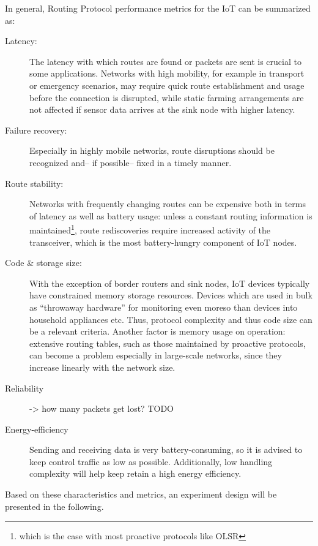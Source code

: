 \documentclass{acm_proc_article-sp}
\begin{document}
In general, Routing Protocol performance metrics for the IoT can be summarized as:
\begin{description}
\item[Latency:] The latency with which routes are found or packets are sent is crucial to some applications. Networks with high mobility, for example in transport or emergency scenarios, may require quick route establishment and usage before the connection is disrupted, while static farming arrangements are not affected if sensor data arrives at the sink node with higher latency.
\item[Failure recovery:] Especially in highly mobile networks, route disruptions should be recognized and-- if possible-- fixed in a timely manner.
\item[Route stability:] Networks with frequently changing routes can be expensive both in terms of latency as well as battery usage: unless a constant routing information is maintained\footnote{ which is the case with most proactive protocols like OLSR\cite{RFC-3626}}, route rediscoveries require increased activity of the transceiver, which is the most battery-hungry component of IoT nodes.
\item[Code \& storage size:] With the exception of border routers and sink nodes, IoT devices typically have constrained memory storage resources. Devices which are used in bulk as ``throwaway hardware'' for monitoring even moreso than devices into household appliances etc. Thus, protocol complexity and thus code size can be a relevant criteria. Another factor is memory usage on operation: extensive routing tables, such as those maintained by proactive protocols, can become a problem especially in large-scale networks, since they increase linearly with the network size.
\item[Reliability] -> how many packets get lost? TODO
\item[Energy-efficiency] Sending and receiving data is very battery-consuming, so it is advised to keep control traffic as low as possible. Additionally, low handling complexity will help keep retain a high energy efficiency.
\end{description}

Based on these characteristics and metrics, an experiment design will be presented in the following.
\end{document}
